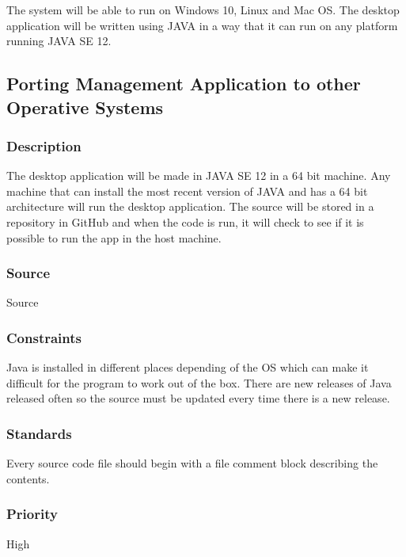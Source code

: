 The system will be able to run on Windows 10, Linux and Mac OS. The desktop application will be written using JAVA in a way that it can run on any platform running JAVA SE 12. 

\subsection{Porting Management Application to other Operative Systems}
\subsubsection{Description}
The desktop application will be made in JAVA SE 12 in a 64 bit machine. Any machine that can install the most recent version of JAVA and has a 64 bit architecture will run the desktop application. The source will be stored in a repository in GitHub and when the code is run, it will check to see if it is possible to run the app in the host machine.
\subsubsection{Source}
Source
\subsubsection{Constraints}
Java is installed in different places depending of the OS which can make it difficult for the program to work out of the box. There are new releases of Java released often so the source must be updated every time there is a new release.
\subsubsection{Standards}
Every source code file should begin with a file comment block describing the contents.
\subsubsection{Priority}
High